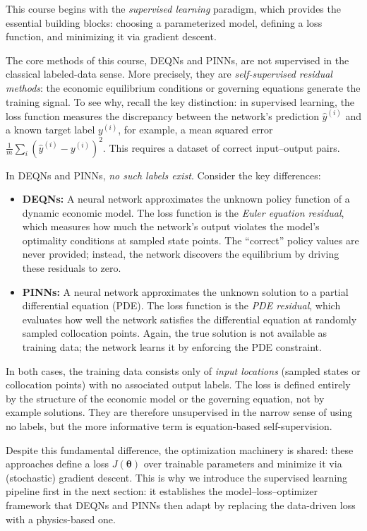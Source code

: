\documentclass[11pt,a4paper]{report}
\begin{document}
This course begins with the \emph{supervised learning} paradigm, which provides the essential building blocks: choosing a parameterized model, defining a loss function, and minimizing it via gradient descent.

The core methods of this course, DEQNs and PINNs, are not supervised in the classical labeled-data sense.  More precisely, they are \emph{self-supervised residual methods}: the economic equilibrium conditions or governing equations generate the training signal.  To see why, recall the key distinction: in supervised learning, the loss function measures the discrepancy between the network's prediction $\hat{y}^{(i)}$ and a known target label $y^{(i)}$, for example, a mean squared error $\frac{1}{m}\sum_i (\hat{y}^{(i)} - y^{(i)})^2$.  This requires a dataset of correct input--output pairs.

In DEQNs and PINNs, \emph{no such labels exist}.  Consider the key differences:
\begin{itemize}\itemsep2pt
    \item \textbf{DEQNs:} A neural network approximates the unknown policy function of a dynamic economic model.  The loss function is the \emph{Euler equation residual}, which measures how much the network's output violates the model's optimality conditions at sampled state points.  The ``correct'' policy values are never provided; instead, the network discovers the equilibrium by driving these residuals to zero.
    \item \textbf{PINNs:} A neural network approximates the unknown solution to a partial differential equation (PDE).  The loss function is the \emph{PDE residual}, which evaluates how well the network satisfies the differential equation at randomly sampled collocation points.  Again, the true solution is not available as training data; the network learns it by enforcing the PDE constraint.
\end{itemize}
In both cases, the training data consists only of \emph{input locations} (sampled states or collocation points) with no associated output labels.  The loss is defined entirely by the structure of the economic model or the governing equation, not by example solutions.  They are therefore unsupervised in the narrow sense of using no labels, but the more informative term is equation-based self-supervision.

Despite this fundamental difference, the optimization machinery is shared: these approaches define a loss $J(\bm{\theta})$ over trainable parameters and minimize it via (stochastic) gradient descent.  This is why we introduce the supervised learning pipeline first in the next section: it establishes the model--loss--optimizer framework that DEQNs and PINNs then adapt by replacing the data-driven loss with a physics-based one.
\end{document}
